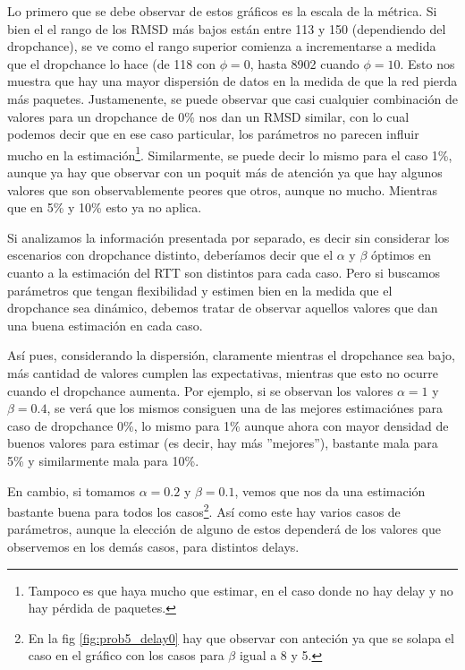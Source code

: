 \par Lo primero que se debe observar de estos gr\'aficos es la escala de la
m\'etrica. Si bien el el rango de los RMSD m\'as bajos est\'an entre 113 y 150
(dependiendo del dropchance), se ve como el rango superior comienza a
incrementarse a medida que el dropchance lo hace (de 118 con $\phi = 0$, hasta
8902 cuando $\phi = 10$. Esto nos muestra que hay una mayor dispersi\'on de
datos en la medida de que la red pierda m\'as paquetes. Justamenente, se puede
observar que casi cualquier combinaci\'on de valores para un dropchance de 0\%
nos dan un RMSD similar, con lo cual podemos decir que en ese caso particular,
los par\'ametros no parecen influir mucho en la estimaci\'on\footnote{Tampoco es
que haya mucho que estimar, en el caso donde no hay delay y no hay p\'erdida de
paquetes.}. Similarmente, se puede decir lo mismo para el caso 1\%, aunque ya
hay que observar con un poquit m\'as de atenci\'on ya que hay algunos valores
que son observablemente peores que otros, aunque no mucho. Mientras que en 5\% y
10\% esto ya no aplica.

\par Si analizamos la informaci\'on presentada por separado, es decir sin
considerar los escenarios con dropchance distinto, deber\'iamos decir que el
$\alpha$ y $\beta$ \'optimos en cuanto a la estimaci\'on del RTT son distintos
para cada caso. Pero si buscamos par\'ametros que tengan flexibilidad y estimen
bien en la medida que el dropchance sea din\'amico, debemos tratar de observar
aquellos valores que dan una buena estimaci\'on en cada caso.

\par As\'i pues, considerando la dispersi\'on, claramente mientras el dropchance
sea bajo, m\'as cantidad de valores cumplen las expectativas, mientras que esto
no ocurre cuando el dropchance aumenta. Por ejemplo, si se observan los valores
$\alpha = 1$ y $\beta = 0.4$, se ver\'a que los mismos consiguen una de las
mejores estimaci\'ones para caso de dropchance 0\%, lo mismo para 1\% aunque
ahora con mayor densidad de buenos valores para estimar (es decir, hay m\'as
''mejores''), bastante mala para 5\% y similarmente mala para 10\%.

\par En cambio, si tomamos $\alpha = 0.2$ y $\beta = 0.1$, vemos que nos da una
estimaci\'on bastante buena para todos los casos\footnote{En la fig
\ref{fig:prob5_delay0} hay que observar con anteci\'on ya que se solapa el caso
en el gr\'afico con los casos para $\beta$ igual a 8 y 5.}. As\'i como este hay
varios casos de par\'ametros, aunque la elecci\'on de alguno de estos
depender\'a de los valores que observemos en los dem\'as casos, para distintos
delays.

